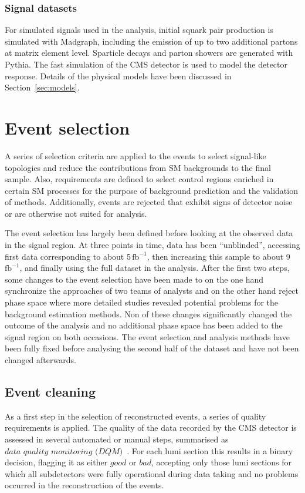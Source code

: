 \subsubsection{Signal datasets}
For simulated signals used in the analysis, initial squark pair production is simulated with Madgraph, including the emission of up to two additional partons at matrix element level. Sparticle decays and parton showers are generated with Pythia. The fast simulation of the CMS detector is used to model the detector response. Details of the physical models have been discussed in Section~\ref{sec:models}.
\section{Event selection}
\label{sec:eventsel}
A series of selection criteria are applied to the events to select signal-like topologies and reduce the contributions from SM backgrounds to the final sample. Also, requirements are defined to select control regions enriched in certain SM processes for the purpose of background prediction and the validation of methods. Additionally, events are rejected that exhibit signs of detector noise or are otherwise not suited for analysis. 

The event selection has largely been defined before looking at the observed data in the signal region. At three points in time, data has been ``unblinded'', accessing first data corresponding to about 5\,$\mathrm{fb^{-1}}$, then increasing this sample to about 9\,$\mathrm{fb^{-1}}$, and finally using the full dataset in the analysis. After the first two steps, some changes to the event selection have been made to on the one hand synchronize the approaches of two teams of analysts and on the other hand reject phase space where more detailed studies revealed potential problems for the background estimation methods. Non of these changes significantly changed the outcome of the analysis and no additional phase space has been added to the signal region on both occasions. The event selection and analysis methods have been fully fixed before analysing the second half of the dataset and have not been changed afterwards. 

\subsection{Event cleaning}
As a first step in the selection of reconstructed events, a series of quality requirements is applied. 
The quality of the data recorded by the CMS detector is assessed in several automated or manual steps, summarised as $\textit{data quality monitoring (DQM)}$~\cite{DQM}. For each lumi section this results in a binary decision, flagging it as either $\textit{good}$ or $\textit{bad}$, accepting only those lumi sections for which all subdetectors were fully operational during data taking and no problems occurred in the reconstruction of the events.

